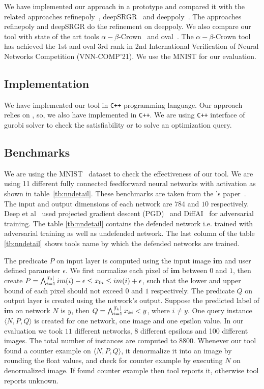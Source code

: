 We have implemented our approach in a prototype and compared it with the related 
approaches refinepoly~\cite{singh2019beyond}, deepSRGR~\cite{yang2021improving} and deeppoly~\cite{singh2019abstract}. 
The approaches refinepoly and deepSRGR do the refinement on deeppoly. We also compare 
our tool with state of the art tools $\alpha - \beta$-Crown~\cite{alphabetacrown} and oval~\cite{ovaltool}. 
The $\alpha - \beta$-Crown tool has achieved the 1st and oval 3rd rank in
2nd International Verification of Neural Networks Competition (VNN-COMP'21). 
We use the MNIST \cite{deng2012mnist} for our evaluation.    
\subsection{Implementation}
We have implemented our tool in \texttt{C++} programming language. Our approach relies on \deeppoly{}, so, 
we also have implemented \deeppoly{} in \texttt{C++}. We are using \texttt{C++} interface of gurobi solver 
to check the satisfiability or to solve an optimization query. 

\subsection{Benchmarks}
We are using the MNIST~\cite{deng2012mnist} dataset to check the effectiveness of our tool. 
We are using 11 different fully connected feedforward neural networks with \relu{} activation as shown in table~\ref{tb:nndetail}.
These benchmarks are taken from the \deeppoly{}'s paper~\cite{singh2019abstract}. 
The input and output dimensions of each network are $784$ and $10$ respectively. 
Deep et al~\cite{singh2019abstract} used projected gradient descent (PGD)~\cite{dong2018boosting}
and DiffAI~\cite{mirman2018differentiable} for adversarial training. The table \ref{tb:nndetail} contains the defended network i.e.
trained with adversarial training as well as undefended network. The last column of the table \ref{tb:nndetail}
shows tools name by which the defended networks are trained.  

The predicate $P$ on input layer is computed using the input image $\boldsymbol{im}$ and user defined parameter $\epsilon$. 
We first normalize each pixel of $\boldsymbol{im}$ between $0$ and $1$, then create 
$P = \bigwedge_{i=1}^{|l_0|} im(i)-\epsilon \leq x_{0i}\leq im(i)+\epsilon$, such that the lower and upper bound of each pixel
should not exceed $0$ and $1$ respectively. The predicate $Q$ on output layer is created using the network's output.    
Suppose the predicted label of $\boldsymbol{im}$ on network $N$ is $y$, then $Q = \bigwedge_{i=1}^{|l_k|} x_{ki} < y$, where $i \neq y$. 
One query instance $\langle N,P,Q \rangle$ is created for one network, one image and one epsilon value. 
In our evaluation we took $11$ different networks, 8 different epsilons and 100 different images. The 
total number of instances are computed to $8800$. Whenever our tool found a counter example on $\langle N,P,Q \rangle$,
it denormalize it into an image by rounding the float values, 
and check for counter example by executing $N$ on denormalized image.
If found counter example then tool reports it, otherwise tool reports unknown.



